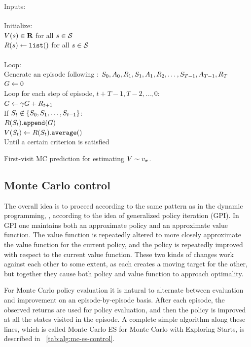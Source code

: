 \begin{table}
\beginalg
Inputs: \pol\\
\\
Initialize:\\
\> $V(s) \in \mathbf{R}$ for all $s\in\mathcal{S}$\\
\> $R(s) \leftarrow {\tt list()}$ for all $s\in\mathcal{S}$\\
\\
Loop: \\
\> Generate an episode following \pol: $S_{0}, A_{0}, R_{1}, S_{1}, A_{1}, R_{2}, \ldots, S_{T-1}, A_{T-1}, R_{T}$\\
\> $G \leftarrow 0$\\
\> Loop for each step of episode, $t+T-1, T-2, \ldots, 0$:\\
\> \> $G \leftarrow \gamma G + R_{t+1}$\\
\> \> If $S_{t} \not\in \{S_{0}, S_{1}, \ldots, S_{t-1}\}$:\\
\> \> \> $R(S_{t}){\tt.append}(G)$\\
\> \> \> $V(S_{t}) \leftarrow R(S_{t}){\tt .average()}$\\
Until a certain criterion is satisfied
\endalg
\caption{First-visit MC prediction for estimating $V \sim v_{\pi}$.}
\label{tab:alg:first-visti-mc-prediction}
\end{table}


\subsection{Monte Carlo control}

The overall idea is to proceed according to the same pattern as in the dynamic programming, \ie,
according to the idea of generalized policy iteration (GPI).
In GPI one maintains both an approximate policy and an approximate value function.
The value function is repeatedly altered to more closely approximate
the value function for the current policy,
and the policy is repeatedly improved with respect to the current value function.
These two kinds of changes work against each other to some extent,
as each creates a moving target for the other,
but together they cause both policy and value function to approach optimality.

For Monte Carlo policy evaluation
it is natural to alternate between evaluation and improvement on an episode-by-episode basis.
After each episode,
the observed returns are used for policy evaluation,
and then the policy is improved at all the states visited in the episode.
A complete simple algorithm along these lines, which is called Monte Carlo ES for Monte Carlo with Exploring Starts,
is described in \tablename~\ref{tab:alg:mc-es-control}.


